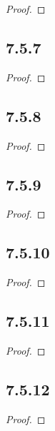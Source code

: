 \documentclass{article}
\begin{document}
\begin{proof}

\end{proof}

\subsection*{7.5.7}

\begin{proof}

\end{proof}

\subsection*{7.5.8}

\begin{proof}

\end{proof}

\subsection*{7.5.9}

\begin{proof}

\end{proof}

\subsection*{7.5.10}

\begin{proof}

\end{proof}

\subsection*{7.5.11}

\begin{proof}

\end{proof}

\subsection*{7.5.12}

\begin{proof}

\end{proof}
\end{document}

